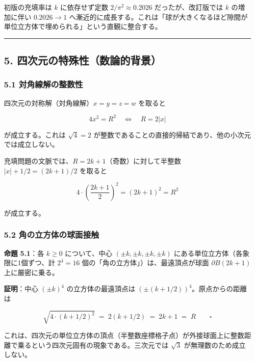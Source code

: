\documentclass[a4paper,11pt]{ltjsarticle}
\theoremstyle{definition}
\begin{document}
初版の充填率は \(k\) に依存せず定数 \(2/\pi^2 \approx 0.2026\)
だったが、改訂版では \(k\) の増加に伴い \(0.2026 \to 1\)
へ漸近的に成長する。これは「球が大きくなるほど隙間が単位立方体で埋められる」という直観に整合する。

\begin{center}\rule{0.5\linewidth}{0.5pt}\end{center}

\subsection{5.
四次元の特殊性（数論的背景）}\label{ux56dbux6b21ux5143ux306eux7279ux6b8aux6027ux6570ux8ad6ux7684ux80ccux666f}

\subsubsection{5.1
対角線解の整数性}\label{ux5bfeux89d2ux7ddaux89e3ux306eux6574ux6570ux6027}

四次元の対称解（対角線解）\(x = y = z = w\) を取ると

\[4x^2 = R^2 \quad\Longleftrightarrow\quad R = 2|x|\]

が成立する。これは \(\sqrt{4} = 2\)
が整数であることの直接的帰結であり、他の小次元では成立しない。

充填問題の文脈では、\(R = 2k+1\)（奇数）に対して半整数
\(|x| + 1/2 = (2k+1)/2\) を取ると

\[4 \cdot \left(\frac{2k+1}{2}\right)^2 = (2k+1)^2 = R^2\]

が成立する。

\subsubsection{5.2
角の立方体の球面接触}\label{ux89d2ux306eux7acbux65b9ux4f53ux306eux7403ux9762ux63a5ux89e6}

\textbf{命題 5.1}：各 \(k \ge 0\) について、中心
\((\pm k, \pm k, \pm k, \pm k)\) にある単位立方体（各象限に1個ずつ、計
\(2^4 = 16\) 個の「角の立方体」）は、最遠頂点が球面 \(\partial B(2k+1)\)
上に厳密に乗る。

\textbf{証明}：中心 \((\pm k)^4\) の立方体の最遠頂点は
\((\pm(k+1/2))^4\)。原点からの距離は

\[\sqrt{4 \cdot (k+1/2)^2} \;=\; 2(k+1/2) \;=\; 2k+1 \;=\; R \qquad \square\]

これは、四次元の単位立方体の頂点（半整数座標格子点）が外接球面上に整数距離で乗るという四次元固有の現象である。三次元では
\(\sqrt{3}\) が無理数のため成立しない。
\end{document}
